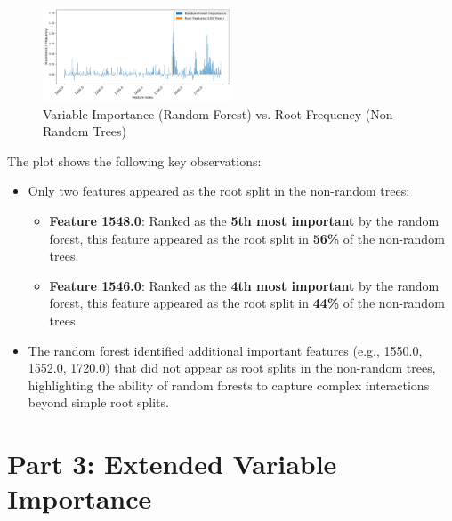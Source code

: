 \documentclass[fleqn,moreauthors,10pt]{ds_report}
\begin{document}
\begin{figure}[h!]
    \centering
    \includegraphics[width=0.5\textwidth]{fig/variable_importance}
    \caption{Variable Importance (Random Forest) vs. Root Frequency (Non-Random Trees)}
    \label{fig:variable_importance}
\end{figure}
The plot shows the following key observations:
\begin{itemize}
    \item Only two features appeared as the root split in the non-random trees:
        \begin{itemize}
            \item \textbf{Feature 1548.0}: Ranked as the \textbf{5th most important} by the random forest, this feature appeared as the root split in \textbf{56\%} of the non-random trees.
            \item \textbf{Feature 1546.0}: Ranked as the \textbf{4th most important} by the random forest, this feature appeared as the root split in \textbf{44\%} of the non-random trees.
        \end{itemize}
    \item The random forest identified additional important features (e.g., 1550.0, 1552.0, 1720.0) that did not appear as root splits in the non-random trees, highlighting the ability of random forests to capture complex interactions beyond simple root splits.
\end{itemize}



\section*{Part 3: Extended Variable Importance}
\end{document}
